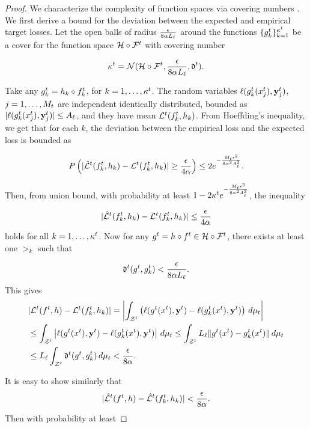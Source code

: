 \documentclass[review,supplement,onefignum,onetabnum]{siamonline250211}
\begin{document}
\begin{proof}
\label{pf_lem_weight_loss_gen}
We characterize the complexity of function spaces via covering numbers \cite{CuckerS02}. We first derive a bound for the deviation between the expected and empirical target losses. Let the open balls of radius $\frac{\epsilon}{8 \alpha L_\ell}$ around the functions $ \{ g^t_k \}_{k=1}^{\kappa^t}$ be a cover for the function space $\mathcal{H} \circ \mathcal{F}^t$ with covering number 

\[
{\kappa^t} = \mathcal{N}( \mathcal{H} \circ \mathcal{F}^t, \frac{\epsilon}{8 \alpha L_\ell}, \mathfrak{d}^t).
\]

Take any $g^t_k = h_k \circ f^t_k$, for $k=1, \dots, \kappa^t$. The random variables $\ell( g^t_k (x^t_j), \mathbf{y}^t_j ) $, $j= 1, \dots, M_t$ are independent identically distributed, bounded as $ | \ell( g^t_k (x^t_j), \mathbf{y}^t_j ) | \leq A_\ell$, and they have mean $\mathcal{L}^t (f^t_k, h_k)$. From Hoeffding's inequality, we get that for each $k$, the deviation between the empirical loss and the expected loss is bounded as

%
\[
P\left( | \hat{\mathcal{L}}^t( f^t_k, h_k) - \mathcal{L}^t (f^t_k, h_k) | \geq \frac{\epsilon}{4 \alpha} \right) \leq 2 e^{-\frac{M_t \epsilon^2}{8 \alpha^2 A_\ell^2}}.
\]
%

Then, from union bound, with probability at least $1 - 2 \kappa^t e^{-\frac{M_t \epsilon^2}{8 \alpha^2 A_\ell^2}}$, the inequality 

\[
| \hat{\mathcal{L}}^t( f^t_k, h_k) - \mathcal{L}^t (f^t_k, h_k) | \leq \frac{\epsilon}{4 \alpha}
\]
%
holds for all $k= 1, \dots, \kappa^t$. Now for any $g^t = h \circ f^t \in \mathcal{H} \circ \mathcal{F}^t$, there exists at least one $\gt_k $ such that 

\[
\mathfrak{d}^t(g^t, g^t_k) <  \frac{\epsilon}{8 \alpha L_\ell}.
\]
%
This gives
%
\begin{equation*}
\begin{split}
& |  \mathcal{L}^t(  f^t, h ) - \mathcal{L}^t(  f^t_k, h_k )   | 
= \left | \int_{\mathcal{Z}^t}  \left( \ell( g^t (x^t), \mathbf{y}^t ) -   \ell( g^t_k (x^t), \mathbf{y}^t )  \right) \, d \mu_t  \right | \\
& \leq  \int_{\mathcal{Z}^t}   \left | \ell(  g^t  (x^t), \mathbf{y}^t ) -   \ell(  g^t_k(x^t), \mathbf{y}^t )  \right | \, d \mu_t  
 \leq  \int_{\mathcal{Z}^t}  L_\ell \|  g^t  (x^t) -  g^t_k(x^t)  \| \, d \mu_t  \\
&\leq  L_\ell  \int_{\mathcal{Z}^t} \mathfrak{d}^t(g^t, g^t_k)  \, d \mu_t  
 <  \frac{\epsilon}{8 \alpha }.
\end{split}
\end{equation*}

%
It is easy to show similarly that
%
\[
|  \hat{\mathcal{L}}^t(  f^t, h ) - \hat{\mathcal{L}}^t(  f^t_k, h_k ) | <  \frac{\epsilon}{8 \alpha }.
\]
%
Then with probability at least 


\end{proof}
\end{document}
